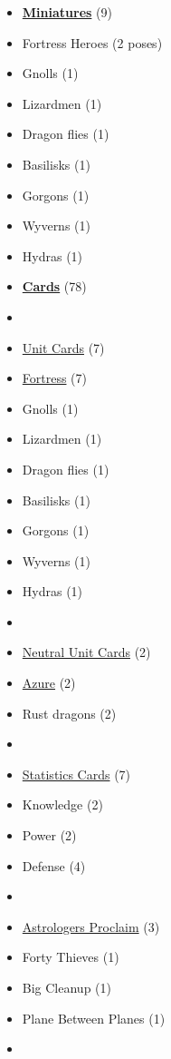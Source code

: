 \begin{multicols}{3}
\begin{itemize}[leftmargin=0pt, label={}, noitemsep, noitemsep]
  \item \textbf{\underline{Miniatures}} (9)
  \item Fortress Heroes (2 poses)
  \item Gnolls (1)
  \item Lizardmen (1)
  \item Dragon flies (1)
  \item Basilisks (1)
  \item Gorgons (1)
  \item Wyverns (1)
  \item Hydras (1)
\end{itemize}

\columnbreak

\begin{itemize}[leftmargin=0pt, label={}, noitemsep, noitemsep]
  \item \textbf{\underline{Cards}} (78)
  \item
  \item \underline{Unit Cards} (7)
  \item \underline{Fortress} (7)
  \item Gnolls (1)
  \item Lizardmen (1)
  \item Dragon flies (1)
  \item Basilisks (1)
  \item Gorgons (1)
  \item Wyverns (1)
  \item Hydras (1)
  \item
  \item \underline{Neutral Unit Cards} (2)
  \item \underline{Azure} (2)
  \item Rust dragons (2)
  \item
  \item \underline{Statistics Cards} (7)
  \item Knowledge (2)
  \item Power (2)
  \item Defense (4)
  \item
  \item \underline{Astrologers Proclaim} (3)
  \item Forty Thieves (1)
  \item Big Cleanup (1)
  \item Plane Between Planes (1)
  \item

\end{itemize}
\end{multicols}
